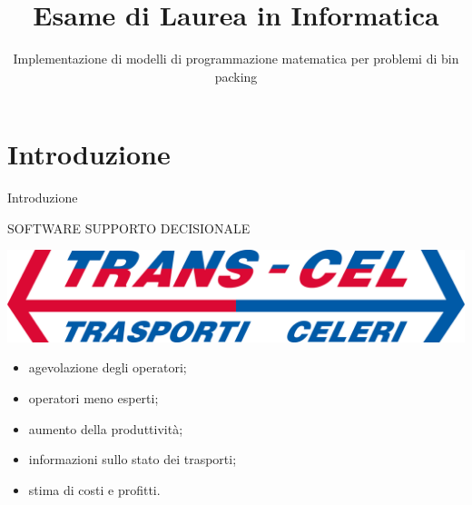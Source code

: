 \documentclass{beamer}
\title{Esame di Laurea in Informatica}
\subtitle{Implementazione di modelli di programmazione matematica per problemi di bin packing}
\author[Daniel Rossi]{%
	\usebox{\authbox}
}
\institute{Dipartimento di Matematica ''Tullio Levi Civita''}
\date{%
	\usebox{\datebox}
}
\begin{document}
\maketitle


\section{Introduzione}

\begin{frame}{Introduzione}
	\begin{minipage}[c]{0.45\textwidth}
		\large{\uppercase{Software supporto decisionale}}
	\end{minipage}
	\hfill
	\begin{minipage}[c]{0.45\textwidth}
		\includegraphics[width=1\linewidth]{figures/logo-transcel}
	\end{minipage}
	\vspace{1.0em}
	\begin{itemize}
		\item agevolazione degli operatori;
		\item operatori meno esperti;
		\item aumento della produttivit\`a;
		\item informazioni sullo stato dei trasporti;
		\item stima di costi e profitti.
	\end{itemize}
\end{frame}
\end{document}
